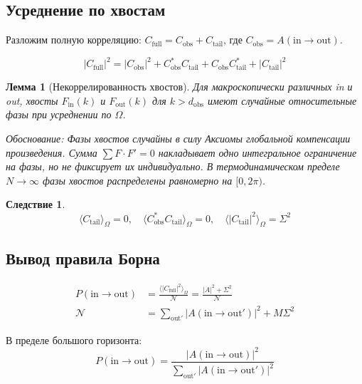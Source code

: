 \documentclass[11pt,a4paper]{article}
\newtheorem{lemma}{Лемма}[section]
\newtheorem{corollary}{Следствие}[section]
\theoremstyle{definition}
\begin{document}
\subsection{Усреднение по хвостам}

Разложим полную корреляцию: $C_{\text{full}} = C_{\text{obs}} + C_{\text{tail}}$, где $C_{\text{obs}} = A(\text{in} \to \text{out})$.

\begin{equation}
    |C_{\text{full}}|^2 = |C_{\text{obs}}|^2 + C_{\text{obs}}^* C_{\text{tail}} + C_{\text{obs}} C_{\text{tail}}^* + |C_{\text{tail}}|^2
\end{equation}

\begin{lemma}[Некоррелированность хвостов]
Для макроскопически различных in и out, хвосты $F_{\text{in}}(k)$ и $F_{\text{out}}(k)$ для $k > d_{\text{obs}}$ имеют случайные относительные фазы при усреднении по $\Omega$.

Обоснование: Фазы хвостов случайны в силу Аксиомы глобальной компенсации произведения. Сумма $\sum F \cdot F' = 0$ накладывает одно интегральное ограничение на фазы, но не фиксирует их индивидуально. В термодинамическом пределе $N \to \infty$ фазы хвостов распределены равномерно на $[0, 2\pi)$.
\end{lemma}

\begin{corollary}
\begin{equation}
    \langle C_{\text{tail}} \rangle_\Omega = 0, \quad \langle C_{\text{obs}}^* C_{\text{tail}} \rangle_\Omega = 0, \quad \langle |C_{\text{tail}}|^2 \rangle_\Omega = \Sigma^2
\end{equation}
\end{corollary}

\subsection{Вывод правила Борна}

\begin{align}
    P(\text{in} \to \text{out}) &= \frac{\langle |C_{\text{full}}|^2 \rangle_\Omega}{\mathcal{N}} = \frac{|A|^2 + \Sigma^2}{\mathcal{N}} \\
    \mathcal{N} &= \sum_{\text{out}'} |A(\text{in} \to \text{out}')|^2 + M\Sigma^2
\end{align}

В пределе большого горизонта:
\begin{equation}
    \boxed{P(\text{in} \to \text{out}) = \frac{|A(\text{in} \to \text{out})|^2}{\sum_{\text{out}'} |A(\text{in} \to \text{out}')|^2}}
\end{equation}
\end{document}
